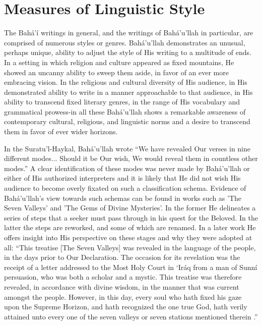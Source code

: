 \documentclass[12pt, oneside]{report}
\begin{document}
\section{Measures of Linguistic Style}
\par
The Bah\'{a}'\'{i} writings in general, and the writings of Bah\'{a}'u'llah in particular, are comprised of numerous styles or genres. Bah\'{a}'u'llah demonstrates an unusual, perhaps unique, ability to adjust the style of His writing to a multitude of ends.
In a setting in which religion and culture appeared as fixed mountains, He showed an uncanny ability to sweep them aside, in favor of an ever more embracing vision.
In the religious and cultural diversity of His audience, in His demonstrated ability to write in a manner approachable to that audience, in His ability to transcend fixed literary genres, in the range of His vocabulary and grammatical prowess-in all these Bah\'{a}'u'llah shows a remarkable awareness of contemporary cultural, religious, and linguistic norms and a desire to transcend them in favor of ever wider horizons.
\par
In the Suratu'l-Haykal, Bah\'{a}'u'llah wrote ``We have revealed Our verses in nine different modes... Should it be Our wish, We would reveal them in countless other modes.''
A clear identification of these modes was never made by Bah\'{a}'u'llah or either of His authorized interpreters and it is likely that He did not wish His audience to become overly fixated on such a classification schema.
Evidence of Bah\'{a}'u'llah's view towards such schemas can be found in works such as 'The Seven Valleys' and 'The Gems of Divine Mysteries'.
In the former He delineates a series of steps that a seeker must pass through in his quest for the Beloved.
In the latter the steps are reworked, and some of which are renamed.
In a later work He offers insight into His perspective on these stages and why they were adopted at all: ``This treatise [The Seven Valleys] was revealed in the language of the people, in the days prior to Our Declaration. The occasion for its revelation was the receipt of a letter addressed to the Most Holy Court in ‘Iráq from a man of Sunní persuasion, who was both a scholar and a mystic. This treatise was therefore revealed, in accordance with divine wisdom, in the manner that was current amongst the people. However, in this day, every soul who hath fixed his gaze upon the Supreme Horizon, and hath recognized the one true God, hath verily attained unto every one of the seven valleys or seven stations mentioned therein \cite{bahaullah_call_nodate}.''
\end{document}
